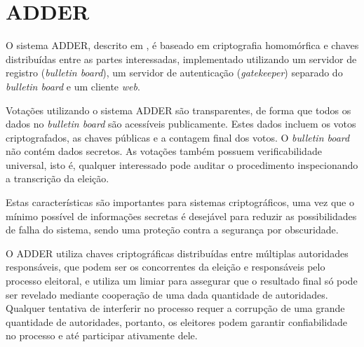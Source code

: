 \section{ADDER}

O sistema ADDER, descrito em \textcite{kiayias2006internet}, é baseado em criptografia homomórfica e chaves distribuídas entre as partes interessadas, implementado utilizando um servidor de registro (\textit{bulletin board}), um servidor de autenticação (\textit{gatekeeper}) separado do \textit{bulletin board} e um cliente \textit{web}.

Votações utilizando o sistema ADDER são transparentes, de forma que todos os dados no \textit{bulletin board} são acessíveis publicamente. Estes dados incluem os votos criptografados, as chaves públicas e a contagem final dos votos. O \textit{bulletin board} não contém dados secretos. As votações também possuem verificabilidade universal, isto é, qualquer interessado pode auditar o procedimento inspecionando a transcrição da eleição.

Estas características são importantes para sistemas criptográficos, uma vez que o mínimo possível de informações secretas é desejável para reduzir as possibilidades de falha do sistema, sendo uma proteção contra a segurança por obscuridade.

O ADDER utiliza chaves criptográficas distribuídas entre múltiplas autoridades responsáveis, que podem ser os concorrentes da eleição e responsáveis pelo processo eleitoral, e utiliza um limiar para assegurar que o resultado final só pode ser revelado mediante cooperação de uma dada quantidade de autoridades. Qualquer tentativa de interferir no processo requer a corrupção de uma grande quantidade de autoridades, portanto, os eleitores podem garantir confiabilidade no processo e até participar ativamente dele.